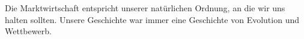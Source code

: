 Die Marktwirtschaft entspricht unserer natürlichen Ordnung, an die wir uns halten sollten.
Unsere Geschichte war immer eine Geschichte von Evolution und Wettbewerb.